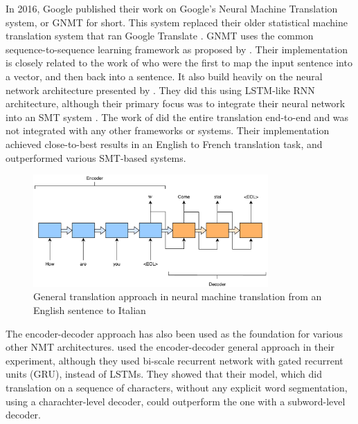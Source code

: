 In 2016, Google published their work on Google's Neural Machine Translation system, or GNMT for short. This system replaced their older statistical machine translation system that ran Google Translate \citep{turovsky2016googletranslatenmt}. GNMT uses the common sequence-to-sequence learning framework as proposed by \citep{sutskever2014sequence, wu2016google}. Their implementation is closely related to the work of \citep{kalchbrenner2013recurrent} who were the first to map the input sentence into a vector, and then back into a sentence. It also build heavily on the neural network architecture presented by \citep{cho2014learning}. They did this using LSTM-like RNN architecture, although their primary focus was to integrate their neural network into an SMT system \citep{cho2014learning, sutskever2014sequence}. The work of \citep{sutskever2014sequence} did the entire translation end-to-end and was not integrated with any other frameworks or systems. Their implementation achieved close-to-best results in an English to French translation task, and outperformed various SMT-based systems.

\begin{figure}[ht]
    \centering
    \includegraphics[width=0.8\textwidth]{fig/related_work/encoder_decoder_en_it.pdf}
    \caption{General translation approach in neural machine translation from an English sentence to Italian}
    \label{fig:machine-translation-encoder-decoder-simple}
\end{figure}

The encoder-decoder approach has also been used as the foundation for various other NMT architectures. \citep{chung2016character} used the encoder-decoder general approach in their experiment, although they used bi-scale recurrent network with gated recurrent units (GRU), instead of LSTMs. They showed that their model, which did translation on a sequence of characters, without any explicit word segmentation, using a charachter-level decoder, could outperform the one with a subword-level decoder.

